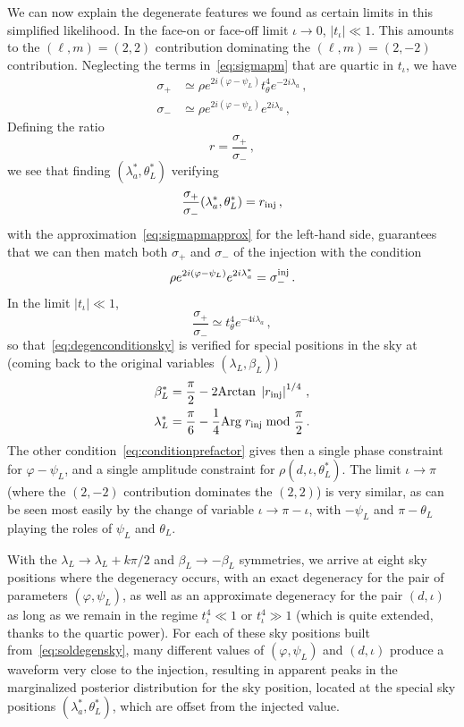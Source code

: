 \documentclass[aps,showpacs,twocolumn,prd,superscriptaddress,nofootinbib]{revtex4-1}
\newcommand{\be}{\begin{equation}}
\newcommand{\ee}{\end{equation}}
\newcommand{\bsub}{\begin{subequations}}
\newcommand{\esub}{\end{subequations}}
\newcommand\betaL{{\beta_{L}}}
\newcommand\lambdaL{{\lambda_{L}}}
\newcommand\psiL{{\psi_{L}}}
\begin{document}
We can now explain the degenerate features we found as certain limits in this simplified likelihood. In the face-on or face-off limit $\iota \rightarrow 0$, $|t_{\iota}| \ll 1$. This amounts to the $(\ell,m)=(2,2)$ contribution dominating the $(\ell, m)=(2,-2)$ contribution. Neglecting the terms in~\eqref{eq:sigmapm} that are quartic in $t_{\iota}$, we have
\bsub\label{eq:sigmapmapprox}
\begin{align}
	\sigma_{+} &\simeq \rho e^{2i(\varphi - \psiL)} t_{\theta}^{4} e^{-2i \lambda_{a}} \,, \\
	\sigma_{-} &\simeq \rho e^{2i(\varphi - \psiL)} e^{2i \lambda_{a}} \,,
\end{align}
\esub
Defining the ratio
\be
	r = \frac{\sigma_{+}}{\sigma_{-}} \,,
\ee
we see that finding $(\lambda_{a}^{*}, \theta_{L}^{*})$ verifying
\be\label{eq:degenconditionsky}
	\frac{\sigma_{+}}{\sigma_{-}} (\lambda_{a}^{*}, \theta_{L}^{*}) = r_{\rm inj} \,,
\ee
with the approximation~\eqref{eq:sigmapmapprox} for the left-hand side, guarantees that we can then match both $\sigma_{+}$ and $\sigma_{-}$ of the injection with the condition
\be\label{eq:degenconditionprefactor}
	\rho e^{2i(\varphi - \psiL)} e^{2i \lambda_{a}^{*}} = \sigma_{-}^{\rm inj}\,.
\ee
In the limit $|t_{\iota}| \ll 1$,
\be
	\frac{\sigma_{+}}{\sigma_{-}} \simeq t_{\theta}^{4} e^{-4i\lambda_{a}} \,,
\ee
so that~\eqref{eq:degenconditionsky} is verified for special positions in the sky at (coming back to the original variables $(\lambdaL, \betaL)$)
\bsub\label{eq:soldegensky}
\begin{align}
	\beta_{L}^{*} &= \frac{\pi}{2} - 2 \mathrm{Arctan} \; \left| r_{\rm inj}\right|^{1/4} \,, \\
	\lambda_{L}^{*} &= \frac{\pi}{6} -\frac{1}{4} \mathrm{Arg} \; r_{\rm inj} \;\mathrm{mod}\; \frac{\pi}{2} \,.
\end{align}
\esub
The other condition~\eqref{eq:conditionprefactor} gives then a single phase constraint for $\varphi - \psiL$, and a single amplitude constraint for $\rho(d, \iota, \theta_{L}^{*})$. The limit $\iota \rightarrow \pi$ (where the $(2,-2)$ contribution dominates the $(2,2)$) is very similar, as can be seen most easily by the change of variable $\iota \rightarrow \pi - \iota$, with $-\psiL$ and $\pi - \theta_{L}$ playing the roles of $\psiL$ and $\theta_{L}$.

With the $\lambdaL \rightarrow \lambdaL + k \pi/2$ and $\betaL \rightarrow - \betaL$ symmetries, we arrive at eight sky positions where the degeneracy occurs, with an exact degeneracy for the pair of parameters $(\varphi, \psiL)$, as well as an approximate degeneracy for the pair $(d, \iota)$ as long as we remain in the regime $t_{\iota}^{4} \ll 1$ or $t_{\iota}^{4} \gg 1$ (which is quite extended, thanks to the quartic power). For each of these sky positions built from~\eqref{eq:soldegensky}, many different values of $(\varphi, \psiL)$ and $(d, \iota)$ produce a waveform very close to the injection, resulting in apparent peaks in the marginalized posterior distribution for the sky position, located at the special sky positions $(\lambda_{a}^{*}, \theta_{L}^{*})$, which are offset from the injected value.
\end{document}

